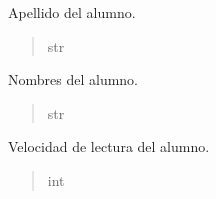 \documentclass[letterpaper,10pt,spanish]{sphinxmanual}
\begin{document}
\begin{fulllineitems}
\begin{fulllineitems}
\begin{quote}
\begin{description}
\end{description}\end{quote}

\end{fulllineitems}



\begin{fulllineitems}

\pysigstartsignatures
{}
\pysigstopsignatures
\sphinxAtStartPar
Apellido del alumno.
\begin{quote}\begin{description}
\sphinxAtStartPar
str

\end{description}\end{quote}

\end{fulllineitems}



\begin{fulllineitems}

\pysigstartsignatures
{}
\pysigstopsignatures
\sphinxAtStartPar
Nombres del alumno.
\begin{quote}\begin{description}
\sphinxAtStartPar
str

\end{description}\end{quote}

\end{fulllineitems}



\begin{fulllineitems}

\pysigstartsignatures
{}
\pysigstopsignatures
\sphinxAtStartPar
Velocidad de lectura del alumno.
\begin{quote}\begin{description}
\sphinxAtStartPar
int

\end{description}\end{quote}

\end{fulllineitems}



\begin{fulllineitems}


\end{fulllineitems}
\end{fulllineitems}
\end{document}
